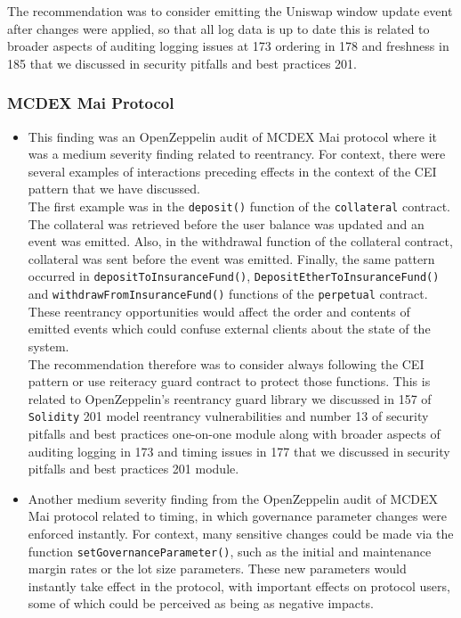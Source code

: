 The recommendation was to consider emitting the Uniswap window update
event after changes were applied, so that all log data is up to date
this is related to broader aspects of auditing logging issues at 173
ordering in 178 and freshness in 185 that we discussed in security
pitfalls and best practices 201.

\subsubsection{MCDEX Mai Protocol}\label{mcdex-mai-protocol}

\begin{itemize}
\item
  This finding was an OpenZeppelin audit of MCDEX Mai protocol where it
  was a medium severity finding related to reentrancy. For context,
  there were several examples of interactions preceding effects in the
  context of the CEI pattern that we have discussed.\\

  The first example was in the \texttt{deposit()} function of the
  \texttt{collateral} contract. The collateral was retrieved before the
  user balance was updated and an event was emitted. Also, in the
  withdrawal function of the collateral contract, collateral was sent
  before the event was emitted. Finally, the same pattern occurred in
  \texttt{depositToInsuranceFund()},
  \texttt{DepositEtherToInsuranceFund()} and
  \texttt{withdrawFromInsuranceFund()} functions of the
  \texttt{perpetual} contract. These reentrancy opportunities would
  affect the order and contents of emitted events which could confuse
  external clients about the state of the system.\\

  The recommendation therefore was to consider always following the CEI
  pattern or use reiteracy guard contract to protect those functions.
  This is related to OpenZeppelin's reentrancy guard library we
  discussed in 157 of \texttt{Solidity} 201 model reentrancy
  vulnerabilities and number 13 of security pitfalls and best practices
  one-on-one module along with broader aspects of auditing logging in
  173 and timing issues in 177 that we discussed in security pitfalls
  and best practices 201 module.
\item
  Another medium severity finding from the OpenZeppelin audit of MCDEX
  Mai protocol related to timing, in which governance parameter changes
  were enforced instantly. For context, many sensitive changes could be
  made via the function \texttt{setGovernanceParameter()}, such as the
  initial and maintenance margin rates or the lot size parameters. These
  new parameters would instantly take effect in the protocol, with
  important effects on protocol users, some of which could be perceived
  as being as negative impacts.\\


\end{itemize}
